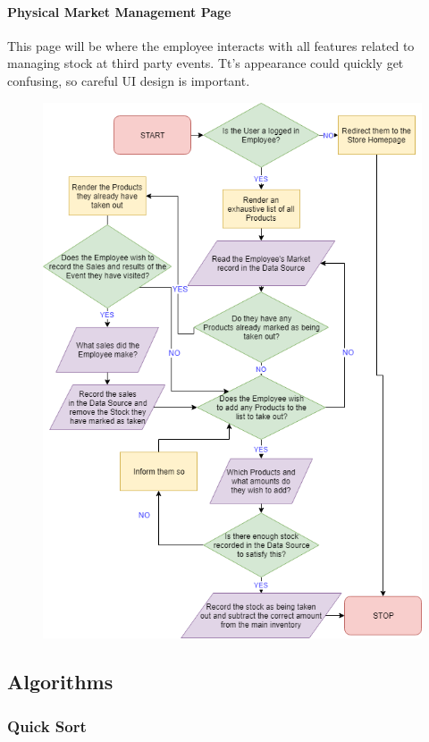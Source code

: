 ﻿\documentclass{article}
\begin{document}
    \paragraph{Physical Market Management Page}
    This page will be where the employee interacts with all features related to managing stock at third party events.
    Tt's appearance could quickly get confusing, so careful UI design is important.
    \begin{figure}[h]
    \includegraphics[scale=0.6]{physicalMarket.png}
    \centering
    \end{figure}
    
    \subsection{Algorithms}
    \subsubsection{Quick Sort}
\end{document}
